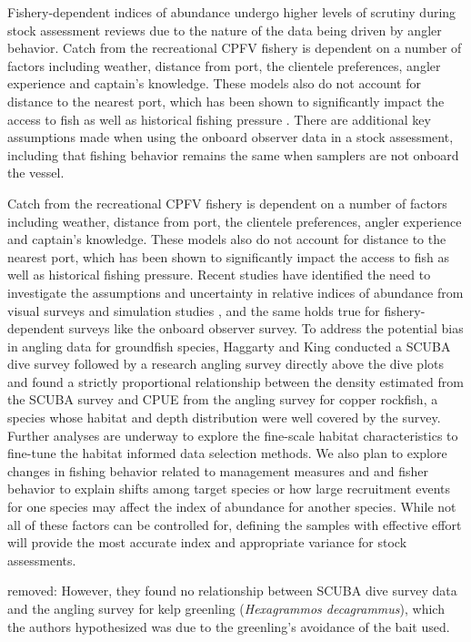 \documentclass[
  12pt,
  authoryear,
  preprint,
  3p]{elsarticle}
\begin{document}
Fishery-dependent indices of abundance undergo higher levels of scrutiny
during stock assessment reviews due to the nature of the data being
driven by angler behavior. Catch from the recreational CPFV fishery is
dependent on a number of factors including weather, distance from port,
the clientele preferences, angler experience and captain's knowledge.
These models also do not account for distance to the nearest port, which
has been shown to significantly impact the access to fish as well as
historical fishing pressure \citep{Miller:2014:SDH}. There are
additional key assumptions made when using the onboard observer data in
a stock assessment, including that fishing behavior remains the same
when samplers are not onboard the vessel.

Catch from the recreational CPFV fishery is dependent on a number of
factors including weather, distance from port, the clientele
preferences, angler experience and captain's knowledge. These models
also do not account for distance to the nearest port, which has been
shown to significantly impact the access to fish as well as historical
fishing pressure. Recent studies have identified the need to investigate
the assumptions and uncertainty in relative indices of abundance from
visual surveys \citep{Bacheler:2015:ERA, Campbell:2015:CRA} and
simulation studies \citep{Siegfried:2016:ISA}, and the same holds true
for fishery-dependent surveys like the onboard observer survey. To
address the potential bias in angling data for groundfish species,
Haggarty and King \citeyearpar{Haggarty:2006:CIR} conducted a SCUBA dive
survey followed by a research angling survey directly above the dive
plots and found a strictly proportional relationship between the density
estimated from the SCUBA survey and CPUE from the angling survey for
copper rockfish, a species whose habitat and depth distribution were
well covered by the survey. Further analyses are underway to explore the
fine-scale habitat characteristics to fine-tune the habitat informed
data selection methods. We also plan to explore changes in fishing
behavior related to management measures and and fisher behavior to
explain shifts among target species or how large recruitment events for
one species may affect the index of abundance for another species. While
not all of these factors can be controlled for, defining the samples
with effective effort will provide the most accurate index and
appropriate variance for stock assessments.

removed: However, they found no relationship between SCUBA dive survey
data and the angling survey for kelp greenling (\emph{Hexagrammos
decagrammus}), which the authors hypothesized was due to the greenling's
avoidance of the bait used.
\end{document}
